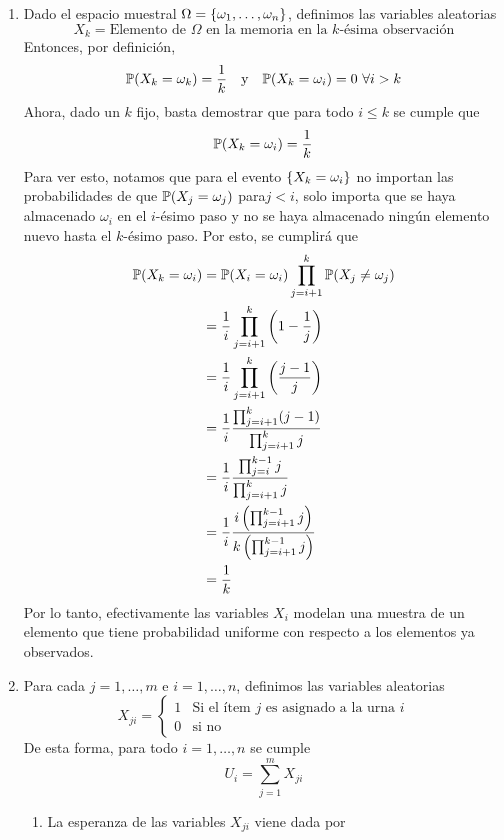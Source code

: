 \begin{solucion}
	\begin{enumerate}[label=\arabic*.]
		\item Dado el espacio muestral $\Omega = \left\{\omega_1, \dots, \omega_n\right\}$, definimos las variables aleatorias
			\[
				X_k = \text{Elemento de $\Omega$ en la memoria en la $k$-ésima observación}
			\]
		Entonces, por definición,
		\begin{align*}
			\mathbb{P}(X_k = \omega_k) = \frac{1}{k} && \text{y} && \mathbb{P}(X_k = \omega_i) = 0 \ \forall i > k
		\end{align*}
		Ahora, dado un $k$ fijo, basta demostrar que para todo $i\leq k$ se cumple que
			\[
				\mathbb{P}(X_k = \omega_i) = \frac{1}{k}
			\]
		Para ver esto, notamos que para el evento $\left\{X_k = \omega_i\right\}$ no importan las probabilidades de que $\mathbb{P}(X_j = \omega_j)$ para$j<i$, solo importa que se haya almacenado $\omega_i$ en el $i$-ésimo paso y no se haya almacenado ningún elemento nuevo hasta el $k$-ésimo paso. Por esto, se cumplirá que
			\begin{align*}
				\mathbb{P}(X_k = \omega_i) &= \mathbb{P}(X_i = \omega_i)\prod_{j=i+1}^{k}\mathbb{P}(X_j \neq \omega_j) \\
						    &= \frac{1}{i}\prod_{j=i+1}^{k}\left(1-\frac{1}{j}\right) \\
						    &= \frac{1}{i}\prod_{j=i+1}^{k}\left(\frac{j-1}{j}\right) \\
						    &= \frac{1}{i}\frac{\prod_{j=i+1}^{k}(j-1)}{\prod_{j=i+1}^{k}j} \\
						    &= \frac{1}{i}\frac{\prod_{j=i}^{k-1}j}{\prod_{j=i+1}^{k}j} \\
						    &= \frac{1}{i}\frac{i\left(\prod_{j=i+1}^{k-1}j\right)}{k\left(\prod_{j=i+1}^{k-1}j\right)} \\
						    &= \frac{1}{k}
			\end{align*}
			Por lo tanto, efectivamente las variables $X_i$ modelan una muestra de un elemento que tiene probabilidad uniforme con respecto a los elementos ya observados.
		\item Para cada $j=1,\dots,m$ e $i=1,\dots,n$, definimos las variables aleatorias
			\[
				X_{ji}= \begin{cases}
					1 & \text{Si el ítem $j$ es asignado a la urna $i$} \\
					0 & \text{si no}
				\end{cases}
			\]
			De esta forma, para todo $i=1,\dots,n$ se cumple
			\[
				U_i = \sum_{j=1}^m X_{ji}
			\]
			\begin{enumerate}[label=\alph*)]
				\item La esperanza de las variables $X_{ji}$ viene dada por

\end{enumerate}
\end{enumerate}
\end{solucion}
